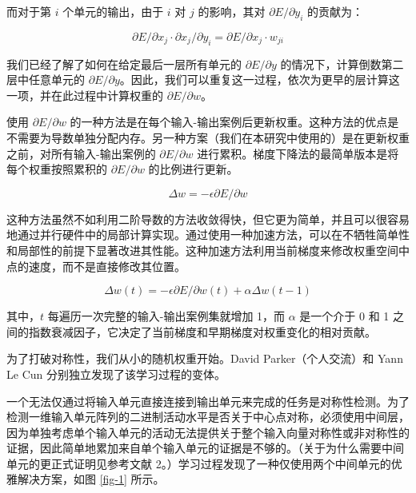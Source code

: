 \documentclass[lang=cn,a4paper,newtx]{elegantpaper}
\begin{document}
而对于第 $i$ 个单元的输出，由于 $i$ 对 $j$ 的影响，其对 $\partial E / \partial y_i$ 的贡献为：

\begin{equation*}
  \partial E / \partial x_j \cdot \partial x_j / \partial y_i = \partial E / \partial x_j \cdot w_{ji}
\end{equation*}

我们已经了解了如何在给定最后一层所有单元的 $\partial{E}/\partial{y}$ 的情况下，计算倒数第二层中任意单元的 $\partial{E}/\partial{y}$。因此，我们可以重复这一过程，依次为更早的层计算这一项，并在此过程中计算权重的 $\partial{E}/\partial{w}$。

使用 $\partial{E}/\partial{w}$ 的一种方法是在每个输入-输出案例后更新权重。这种方法的优点是不需要为导数单独分配内存。另一种方案（我们在本研究中使用的）是在更新权重之前，对所有输入-输出案例的 $\partial{E}/\partial{w}$ 进行累积。梯度下降法的最简单版本是将每个权重按照累积的 $\partial{E}/\partial{w}$ 的比例进行更新。

\begin{equation}
  \Delta{w} = -\epsilon\partial{E}/\partial{w}
\end{equation}

这种方法虽然不如利用二阶导数的方法收敛得快，但它更为简单，并且可以很容易地通过并行硬件中的局部计算实现。通过使用一种加速方法，可以在不牺牲简单性和局部性的前提下显著改进其性能。这种加速方法利用当前梯度来修改权重空间中点的速度，而不是直接修改其位置。

\begin{equation}
  \Delta{w(t)} = -\epsilon\partial{E}/\partial{w(t)} + \alpha\Delta{w(t-1)}
\end{equation}

其中，$t$ 每遍历一次完整的输入-输出案例集就增加 1，而 $\alpha$ 是一个介于 0 和 1 之间的指数衰减因子，它决定了当前梯度和早期梯度对权重变化的相对贡献。

为了打破对称性，我们从小的随机权重开始。David Parker（个人交流）和 Yann Le Cun 分别独立发现了该学习过程的变体。

一个无法仅通过将输入单元直接连接到输出单元来完成的任务是对称性检测。为了检测一维输入单元阵列的二进制活动水平是否关于中心点对称，必须使用中间层，因为单独考虑单个输入单元的活动无法提供关于整个输入向量对称性或非对称性的证据，因此简单地累加来自单个输入单元的证据是不够的。（关于为什么需要中间单元的更正式证明见参考文献 2。）学习过程发现了一种仅使用两个中间单元的优雅解决方案，如图 \ref{fig-1} 所示。
\end{document}
